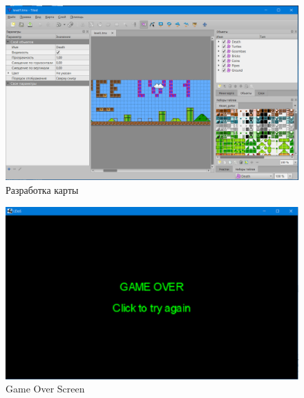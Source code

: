 \begin{figure}[H]
	\begin{center}
		\includegraphics[scale=0.7]{pics/Screenshot_1.png}
		\caption{Разработка карты} 
		\label{pic:pic_name} %
	\end{center}
\end{figure}


\begin{figure}[H]
	\begin{center}
		\includegraphics[scale=0.7]{pics/Screenshot_2.png}
		\caption{Game Over Screen} 
		\label{pic:pic_name} %
	\end{center}
\end{figure}



